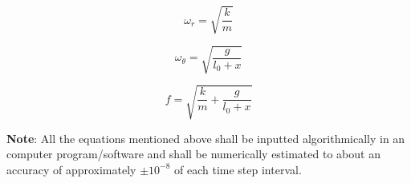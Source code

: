     \begin{equation}
        \omega_r = \sqrt{\frac{k}{m}}
        \label{eq5}
    \end{equation}
            
    \begin{equation}
        \omega_\theta = \sqrt{\frac{g}{l_0 + x}}
        \label{eq6}
    \end{equation}
            
    \begin{equation}
        f = \sqrt{\frac{k}{m} + \frac{g}{l_0 + x}}
        \label{eq7}
    \end{equation}
            
{\textbf{Note}: All the equations mentioned above shall be inputted algorithmically in an computer program/software and shall be numerically estimated to about an accuracy of approximately $\pm10^{-8}$ of each time step interval.}
            
            




